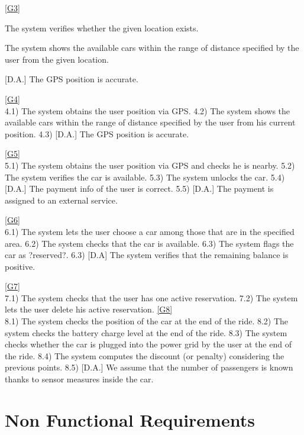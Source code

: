 \documentclass[11pt,a4paper]{report}
\begin{document}
	\ref{G3} \\
	\begin{Req}
		\item The system verifies whether the given location exists.
		\item The system shows the available cars within the range of distance specified by the user from the given location.
	\end{Req}
	[D.A.] The GPS position is accurate.
	
 	\ref{G4} \\
 	4.1) The system obtains the user position via GPS.
 	4.2) The system shows the available cars within the range of distance specified by the user from his current position.
 	4.3) [D.A.] The GPS position is accurate.
 	
 	\ref{G5} \\
 	5.1) The system obtains the user position via GPS and checks he is nearby.
 	5.2) The system verifies the car is available.
 	5.3) The system unlocks the car.
 	5.4) [D.A.] The payment info of the user is correct.
 	5.5) [D.A.] The payment is assigned to an external service.
 	
	\ref{G6} \\
	6.1) The system lets the user choose a car among those that are in the specified area.
	6.2) The system checks that the car is available.
	6.3) The system flags the car as ?reserved?.
	6.3) [D.A] The system verifies that the remaining balance is positive. 
	
	\ref{G7} \\
	7.1) The system checks that the user has one active reservation.
	7.2) The system lets the user delete his active reservation.
	\ref{G8} \\
	8.1) The system checks the position of the car at the end of the ride.
	8.2) The system checks the battery charge level at the end of the ride.
	8.3) The system checks whether the car is plugged into the power grid by the user at the end of the ride.
	8.4) The system computes the discount (or penalty) considering the previous points.
	8.5) [D.A.] We assume that the number of passengers is known thanks to sensor measures inside the car.
\section{Non Functional Requirements}
\end{document}
